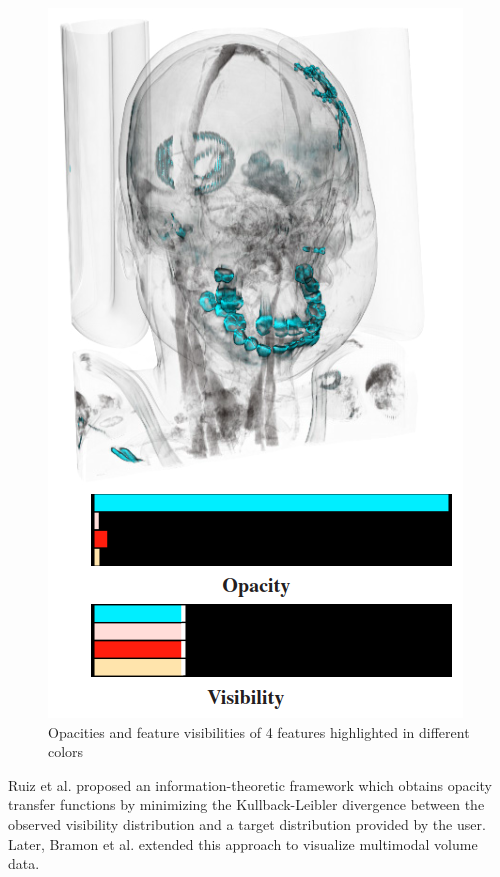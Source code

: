 \begin{figure}
\begin{minipage}{.49\textwidth}
\includegraphics[width=1\linewidth]{images/wang_efficient_2011_b}
\end{minipage}
\caption{Opacities and feature visibilities of 4 features highlighted in different colors \cite{wang_efficient_2011}}
\label{fig:wang_efficient_2011}
\end{figure}

Ruiz et al. \cite{ruiz_automatic_2011} proposed an information-theoretic framework which obtains opacity transfer functions by minimizing the Kullback-Leibler divergence between the observed visibility distribution and a target distribution provided by the user. Later, Bramon et al. \cite{bramon_information_2013} extended this approach to visualize multimodal volume data.

